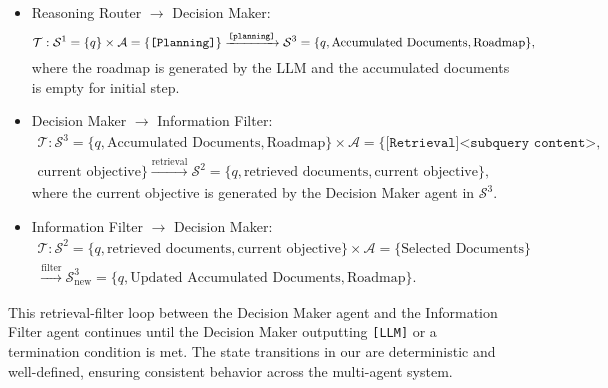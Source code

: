 \begin{itemize}[topsep=1pt, partopsep=1pt, leftmargin=12pt, itemsep=-1pt]
    \item Reasoning Router $\rightarrow$ Decision Maker: %
    \begin{equation}
        \mathcal{T}: \mathcal{S}^1=\{q\} \times \mathcal{A}=\{\texttt{[Planning]}\} \xrightarrow{\text{\texttt{[planning]}}} \mathcal{S}^3 = \{q, \text{Accumulated Documents}, \text{Roadmap}\},
    \end{equation}
    where the roadmap is generated by the LLM and the accumulated documents is empty for initial step.
    \item Decision Maker $\rightarrow$ Information Filter: %
    \begin{align}
        \mathcal{T}: \mathcal{S}^3=\{q, \text{Accumulated Documents}, \text{Roadmap}\} \times \mathcal{A}=\{\texttt{[Retrieval]<subquery content>}, \nonumber \\ \text{current objective}\} \xrightarrow{\text{retrieval}} \mathcal{S}^2 = \{q, \text{retrieved documents}, \text{current objective}\},
    \end{align}
    where the current objective is generated by the Decision Maker agent in $\mathcal{S}^3$.
    \item Information Filter $\rightarrow$ Decision Maker: %
    \begin{align}
        \mathcal{T}: \mathcal{S}^2=\{q, \text{retrieved documents}, \text{current objective}\} \times \mathcal{A}=\{\text{Selected Documents}\} \nonumber \\ \xrightarrow{\text{filter}} \mathcal{S}^3_{\text{new}} = \{q, \text{Updated Accumulated Documents}, \text{Roadmap}\}.
    \end{align}
\end{itemize}

This retrieval-filter loop between the Decision Maker agent and the Information Filter agent continues until the Decision Maker outputting \texttt{[LLM]} or a termination condition is met. The state transitions in our \modelname are deterministic and well-defined, ensuring consistent behavior across the multi-agent system.


